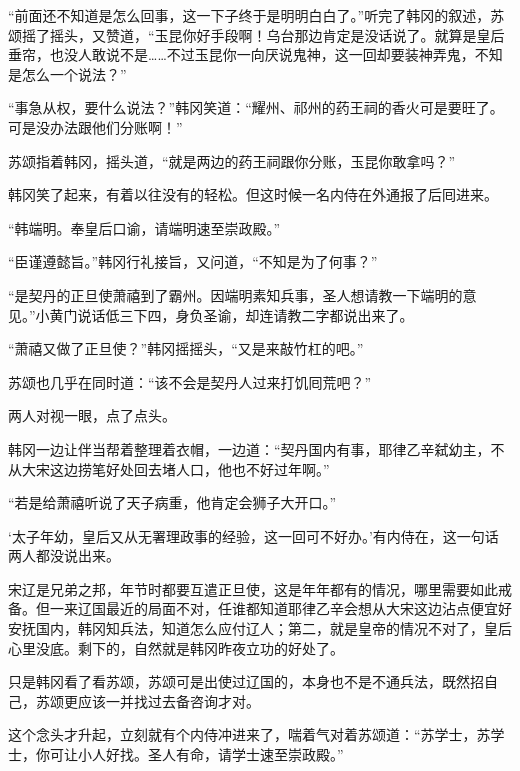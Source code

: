 “前面还不知道是怎么回事，这一下子终于是明明白白了。”听完了韩冈的叙述，苏颂摇了摇头，又赞道，“玉昆你好手段啊！乌台那边肯定是没话说了。就算是皇后垂帘，也没人敢说不是……不过玉昆你一向厌说鬼神，这一回却要装神弄鬼，不知是怎么一个说法？”

“事急从权，要什么说法？”韩冈笑道：“耀州、祁州的药王祠的香火可是要旺了。可是没办法跟他们分账啊！”

苏颂指着韩冈，摇头道，“就是两边的药王祠跟你分账，玉昆你敢拿吗？”

韩冈笑了起来，有着以往没有的轻松。但这时候一名内侍在外通报了后囘进来。

“韩端明。奉皇后口谕，请端明速至崇政殿。”

“臣谨遵懿旨。”韩冈行礼接旨，又问道，“不知是为了何事？”

“是契丹的正旦使萧禧到了霸州。因端明素知兵事，圣人想请教一下端明的意见。”小黄门说话低三下四，身负圣谕，却连请教二字都说出来了。

“萧禧又做了正旦使？”韩冈摇摇头，“又是来敲竹杠的吧。”

苏颂也几乎在同时道：“该不会是契丹人过来打饥囘荒吧？”

两人对视一眼，点了点头。

韩冈一边让伴当帮着整理着衣帽，一边道：“契丹国内有事，耶律乙辛弑幼主，不从大宋这边捞笔好处回去堵人口，他也不好过年啊。”

“若是给萧禧听说了天子病重，他肯定会狮子大开口。”

‘太子年幼，皇后又从无署理政事的经验，这一回可不好办。’有内侍在，这一句话两人都没说出来。

宋辽是兄弟之邦，年节时都要互遣正旦使，这是年年都有的情况，哪里需要如此戒备。但一来辽国最近的局面不对，任谁都知道耶律乙辛会想从大宋这边沾点便宜好安抚国内，韩冈知兵法，知道怎么应付辽人；第二，就是皇帝的情况不对了，皇后心里没底。剩下的，自然就是韩冈昨夜立功的好处了。

只是韩冈看了看苏颂，苏颂可是出使过辽国的，本身也不是不通兵法，既然招自己，苏颂更应该一并找过去备咨询才对。

这个念头才升起，立刻就有个内侍冲进来了，喘着气对着苏颂道：“苏学士，苏学士，你可让小人好找。圣人有命，请学士速至崇政殿。”



